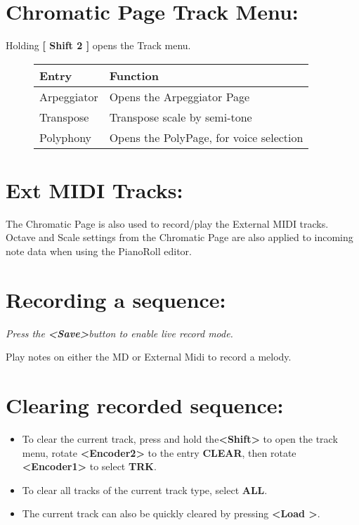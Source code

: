 \section{Chromatic Page Track Menu:}
Holding \textbf{[ Shift 2 ]} opens the Track menu.
\begin{figure}[hb]
    \begin{tabular}{|l|l|}
    \hline
    \rowcolor[HTML]{C0C0C0} 
    Entry            & Function \\ \hline
    Arpeggiator      & Opens the Arpeggiator Page \\ \hline
    Transpose        & Transpose scale by semi-tone\\ \hline
    Polyphony        & Opens the PolyPage, for voice selection\\ \hline
    \end{tabular}
\end{figure}
\section{Ext MIDI Tracks:}
The Chromatic Page is also used to record/play the External MIDI tracks.
Octave and Scale settings from the Chromatic Page are also applied to incoming note data when using the PianoRoll editor.
\newpage
\section{Recording a sequence:}
\textit{Press the \textbf{<Save>}button to enable live record mode.\\}

Play notes on either the MD or External Midi to record a melody.

\section{Clearing recorded sequence:}
\begin{itemize}
\item To clear the current track, press and hold the\textbf{<Shift>} to open the track menu, rotate \textbf{<Encoder2>} to the entry \textbf{CLEAR}, then rotate \textbf{<Encoder1>} to select \textbf{TRK}.
\item To clear all tracks of the current track type, select \textbf{ALL}.
\item The current track can also be quickly cleared by pressing \textbf{<Load >}.
\end{itemize}

